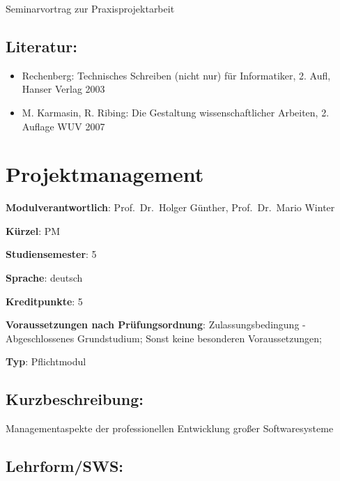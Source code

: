 Seminarvortrag zur Praxisprojektarbeit

\section*{Literatur:}\label{literatur-15}

\begin{itemize}
\tightlist
\item
  Rechenberg: Technisches Schreiben (nicht nur) für Informatiker, 2.
  Aufl, Hanser Verlag 2003
\item
  M. Karmasin, R. Ribing: Die Gestaltung wissenschaftlicher Arbeiten, 2.
  Auflage WUV 2007
\end{itemize}

\chapter{Projektmanagement}\label{projektmanagement}

\begin{modulHead}
\textbf{Modulverantwortlich}: Prof.~Dr.~Holger
Günther, Prof.~Dr.~Mario
Winter
\end{modulHead}
\begin{modulHead}
\textbf{Kürzel}:
PM
\end{modulHead}
\begin{modulHead}
\textbf{Studiensemester}:
5
\end{modulHead}
\begin{modulHead}
\textbf{Sprache}:
deutsch
\end{modulHead}
\begin{modulHead}
\textbf{Kreditpunkte}:
5
\end{modulHead}
\begin{modulHead}
\textbf{Voraussetzungen nach
Prüfungsordnung}: Zulassungsbedingung - Abgeschlossenes Grundstudium;
Sonst keine besonderen
Voraussetzungen;
\end{modulHead}
\begin{modulHead}
\textbf{Typ}:
Pflichtmodul
\end{modulHead}


\section*{Kurzbeschreibung:}\label{kurzbeschreibung-3}

Managementaspekte der professionellen Entwicklung großer Softwaresysteme

\section*{Lehrform/SWS:}\label{lehrformsws-20}

